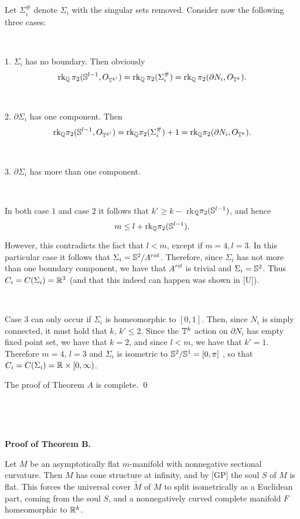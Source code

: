 \

\

Let $\Sigma_i^\#$ denote $\Sigma_i$ with the singular sets removed.
Consider now the following three cases:

\

1. $\Sigma_i$ has no boundary. 
Then obviously
$$\hbox{rk}_{\Bbb Q}\,\pi_2({\Bbb S}^{l-1},O_{{\Bbb T}^{k'}})
=\hbox{rk}_{\Bbb Q}\,\pi_2( \Sigma_i^\#)
=\hbox{rk}_{\Bbb Q}\,\pi_2(\partial N_i,O_{{\Bbb T}^k}).$$

\

2. $\partial \Sigma_i$ has one component. 
Then 
$$\hbox{rk}_{\Bbb Q}\pi_2({\Bbb S}^{l-1},O_{{\Bbb T}^{k'}})=\hbox{rk}_{\Bbb Q}\pi_2( \Sigma_i^\#)+1=\hbox{rk}_{\Bbb Q}\pi_2(\partial N_i,O_{{\Bbb T}^k}).$$

\

3. $\partial \Sigma_i$ has more than one component.

\ 

In both case $1$ and case $2$ it follows that 
$k'\ge k-$ rk$_{\Bbb Q}\pi_2({\Bbb S}^{l-1})$, and hence  
$$m\le l+\text{rk}_{\Bbb Q}\pi_2({\Bbb S}^{l-1}).$$

However, this contradicts the fact that $l<m$, 
except if $m=4, l=3$.
In this particular case it follows that $\Sigma_i={\Bbb S}^2/A^{rot}$.
Therefore,
since $\Sigma_i$ has not more than one boundary component,
we have that
$A^{rot}$ is trivial and $\Sigma_i={\Bbb S}^2$.
Thus $C_i=C(\Sigma_i)={\Bbb R}^3$
(and that this indeed can happen was shown in [U]).

\

Case $3$ can only occur
if $\Sigma_i$ is homeomorphic to $[0,1]$.
Then, since $N_i$ is simply connected, it must hold that $k$, $k'\le 2$.
Since  the ${\Bbb T}^k$ action on $\partial N_i$ has empty fixed point set,
we have that $k=2$,
and since $l<m$, we have that $k'=1$. 
Therefore $m=4$, $l=3$ and $\Sigma_i$ is isometric
to ${\Bbb S}^2/{\Bbb S}^1=[0,\pi]$ , so that $C_i=C(\Sigma_i)={\Bbb R}\times [0,\infty)$.  

The proof of Theorem $A$ is complete. \qed

 
\ 

\

\noindent
{\bf Proof of Theorem B.}

Let $M$ be an asymptotically flat $m$-manifold with nonnegative sectional
curvature. Then $M$ has cone structure at infinity,
and by [GP] the soul $S$ of $M$ is flat.
This forces the universal cover $\tilde M$ of $M$
to split isometrically as a Euclidean part, coming from the soul $S$,
and a nonnegatively curved complete manifold $F$ homeomorphic to ${\Bbb R}^k$.

